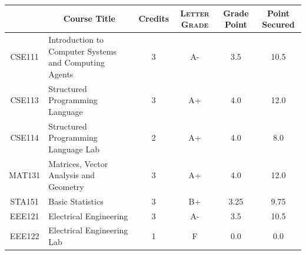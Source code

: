 \documentclass[11pt]{article}
\newcommand*{\numtwo}[1]{\pgfmathprintnumber[
                    fixed, precision=2, fixed zerofill=true]{#1}}
\begin{document}
                \begin{center}
                    \renewcommand{\arraystretch}{1.08}
                    
                \begin{tabular}{|c|l|c|>{\scshape}c|c|c|}
                \hline  \rule[-1ex]{0pt}{3.5ex} {\centering{\bf Course Code}} &  \multicolumn{1}{c|}{\textbf{Course Title}}  & {\bf Credits} & {\bf Letter Grade} & {\bf Grade Point} & {\bf Point Secured}  \\ 
                \hline   CSE111 &  Introduction to Computer Systems and Computing Agents		 & 3 & A- & 3.5 & 10.5 \\ %
                \hline   CSE113 &  Structured Programming Language		 & 3 & A+ & 4.0 & 12.0 \\ %
                \hline   CSE114 &  Structured Programming Language Lab		 & 2 & A+ & 4.0 & 8.0 \\ %
                \hline   MAT131 &  Matrices, Vector Analysis and Geometry		 & 3 & A+ & 4.0 & 12.0 \\ %
                \hline   STA151 &  Basic Statistics		 & 3 & B+ & 3.25 & 9.75 \\ %
                \hline   EEE121 &  Electrical Engineering		 & 3 & A- & 3.5 & 10.5 \\ %
                \hline   EEE122 &  Electrical Engineering Lab		 & 1 & F & 0.0 & 0.0 \\ %

\hline                %
                \end{tabular}
                \end{center}
                \renewcommand{\arraystretch}{1.03}
\end{document}
